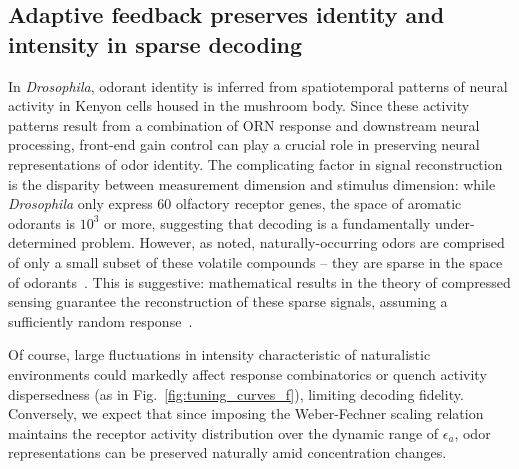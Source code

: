 \subsection{Adaptive feedback preserves identity and intensity in sparse decoding}


In \textit{Drosophila}, odorant identity is inferred from spatiotemporal patterns of neural activity in Kenyon cells housed in the mushroom body. Since these activity patterns result from a combination of ORN response and downstream neural processing, front-end gain control can play a crucial role in preserving neural representations of odor identity. The complicating factor in signal reconstruction is the disparity between measurement dimension and stimulus dimension: while \textit{Drosophila} only express 60 olfactory receptor genes, the space of aromatic odorants is $10^3$ or more, suggesting that decoding is a fundamentally under-determined problem. However, as noted, naturally-occurring odors are comprised of only a small subset of these volatile compounds -- they are sparse in the space of odorants~\cite{vijay_1}. This is suggestive: mathematical results in the theory of compressed sensing guarantee the reconstruction of these sparse signals, assuming a sufficiently random response~\cite{CS_donoho, CS_tao, CS_ganguli}.



Of course, large fluctuations in intensity characteristic of naturalistic environments could markedly affect response combinatorics or quench activity dispersedness (as in Fig.~\ref{fig:tuning_curves_f}), limiting decoding fidelity. Conversely, we expect that since imposing the Weber-Fechner scaling relation maintains the receptor activity distribution over the dynamic range of $\epsilon_a$, odor representations can be preserved naturally amid concentration changes.







